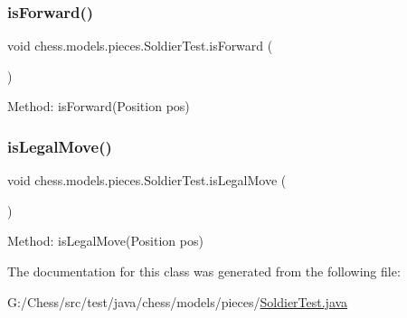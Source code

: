 \subsubsection{\texorpdfstring{is\+Forward()}{isForward()}}
{\footnotesize\ttfamily void chess.\+models.\+pieces.\+Soldier\+Test.\+is\+Forward (\begin{DoxyParamCaption}{ }\end{DoxyParamCaption})}

Method\+: is\+Forward(\+Position pos) \mbox{\label{classchess_1_1models_1_1pieces_1_1_soldier_test_ad6deec316336baea729d2c952597cbf7}} 
\subsubsection{\texorpdfstring{is\+Legal\+Move()}{isLegalMove()}}
{\footnotesize\ttfamily void chess.\+models.\+pieces.\+Soldier\+Test.\+is\+Legal\+Move (\begin{DoxyParamCaption}{ }\end{DoxyParamCaption})}

Method\+: is\+Legal\+Move(\+Position pos) 

The documentation for this class was generated from the following file\+:\begin{DoxyCompactItemize}
\item 
G\+:/\+Chess/src/test/java/chess/models/pieces/\mbox{\hyperlink{_soldier_test_8java}{Soldier\+Test.\+java}}\end{DoxyCompactItemize}
